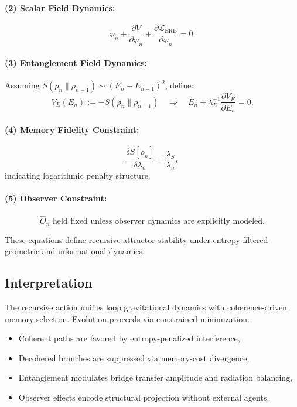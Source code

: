 \paragraph{(2) Scalar Field Dynamics:}
\[
\ddot{\varphi}_n + \frac{\partial V}{\partial \varphi_n} + \frac{\partial \mathcal{L}_{\text{ERB}}}{\partial \varphi_n} = 0.
\]

\paragraph{(3) Entanglement Field Dynamics:}
Assuming \( S(\rho_n \| \rho_{n-1}) \sim (E_n - E_{n-1})^2 \), define:
\[
V_E(E_n) := -S(\rho_n \| \rho_{n-1}) \quad \Rightarrow \quad \ddot{E}_n + \lambda_E^{-1} \frac{\partial V_E}{\partial E_n} = 0.
\]

\paragraph{(4) Memory Fidelity Constraint:}
\[
\frac{\delta S[\rho_n]}{\delta \lambda_n} = \frac{\lambda_S}{\lambda_n},
\]
indicating logarithmic penalty structure.

\paragraph{(5) Observer Constraint:}
\[
\hat{O}_n \text{ held fixed unless observer dynamics are explicitly modeled}.
\]

These equations define recursive attractor stability under entropy-filtered geometric and informational dynamics.

\subsection{Interpretation}

The recursive action unifies loop gravitational dynamics with coherence-driven memory selection. Evolution proceeds via constrained minimization:
\begin{itemize}
  \item Coherent paths are favored by entropy-penalized interference,
  \item Decohered branches are suppressed via memory-cost divergence,
  \item Entanglement modulates bridge transfer amplitude and radiation balancing,
  \item Observer effects encode structural projection without external agents.
\end{itemize}

